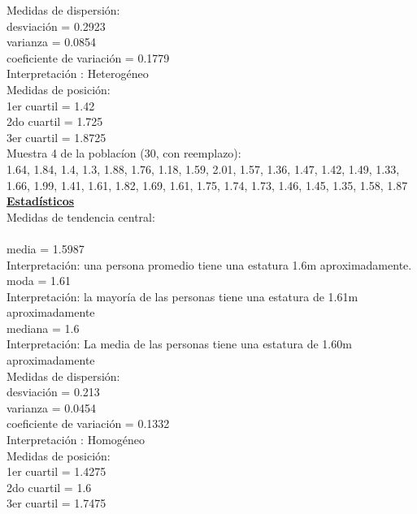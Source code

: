 \documentclass[a4paper,12pt]{article}
\begin{document}
\begin{enumerate}
Medidas de dispersi\'on:\\
desviaci\'on = 0.2923\\
varianza =  0.0854\\
coeficiente de variaci\'on = 0.1779\\
Interpretaci\'on : Heterog\'eneo\\

Medidas de posici\'on:\\
1er cuartil = 1.42\\
2do cuartil = 1.725\\
3er cuartil = 1.8725\\

Muestra 4 de la poblac\'ion (30, con reemplazo): \\

1.64,	1.84,	1.4,    1.3,    1.88,	1.76,
1.18,	1.59,	2.01,	1.57,	1.36,	1.47,
1.42,	1.49,	1.33,	1.66,	1.99,	1.41,
1.61,	1.82,	1.69,	1.61,	1.75,	1.74,
1.73,	1.46,	1.45,	1.35,	1.58,	1.87\\

\textbf{\underline{Estad\'isticos}} \\

Medidas de tendencia central:\\\\
media = 1.5987\\
Interpretaci\'on: una persona promedio tiene una estatura 1.6m aproximadamente.\\
moda = 1.61\\
Interpretaci\'on: la mayor\'ia de las personas tiene una estatura de 1.61m aproximadamente\\
mediana =  1.6\\
Interpretaci\'on: La media de las personas tiene una estatura de 1.60m aproximadamente\\

Medidas de dispersi\'on:\\
desviaci\'on = 0.213\\
varianza = 0.0454\\
coeficiente de variaci\'on = 0.1332\\
Interpretaci\'on : Homog\'eneo\\

Medidas de posici\'on:\\
1er cuartil = 1.4275\\
2do cuartil = 1.6\\
3er cuartil = 1.7475\\


\end{enumerate}
\end{document}

